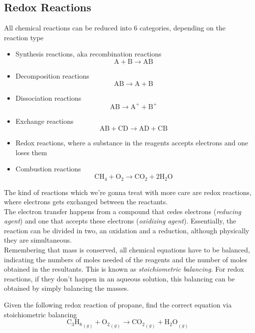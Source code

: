 \documentclass[../qm.tex]{subfiles}
\begin{document}
\subsection{Redox Reactions}
All chemical reactions can be reduced into 6 categories, depending on the reaction type
\begin{itemize}
\item Synthesis reactions, aka recombination reactions
	\begin{equation*}
		\mathrm{A}+\mathrm{B}\to\mathrm{AB}
	\end{equation*}
\item Decomposition reactions
	\begin{equation*}
		\mathrm{AB}\to\mathrm{A}+\mathrm{B}
	\end{equation*}
\item Dissociation reactions
	\begin{equation*}
		\mathrm{AB}\to\mathrm{A^+}+\mathrm{B^+}
	\end{equation*}
\item Exchange reactions
	\begin{equation*}
		\mathrm{AB}+\mathrm{CD}\to\mathrm{AD}+\mathrm{CB}
	\end{equation*}
\item Redox reactions, where a substance in the reagents accepts electrons and one loses them
\item Combustion reactions
	\begin{equation*}
		\mathrm{CH_4}+\mathrm{O_2}\to\mathrm{CO_2}+2\mathrm{H_2O}
	\end{equation*}
\end{itemize}
The kind of reactions which we're gonna treat with more care are redox reactions, where electrons gets exchanged between the reactants.\\
The electron transfer happens from a compound that cedes electrons (\textit{reducing agent}) and one that accepts these electrons  (\textit{oxidizing agent}). Essentially, the reaction can be divided in two, an oxidation and a reduction, although physically they are simultaneous.\\
Remembering that mass is conserved, all chemical equations have to be balanced, indicating the numbers of moles needed of the reagents and the number of moles obtained in the resultants. This is known as \textit{stoichiometric balancing}. For redox reactions, if they don't happen in an aqueous solution, this balancing can be obtained by simply balancing the masses.
\begin{exe}
	Given the following redox reaction of propane, find the correct equation via stoichiometric balancing
	\begin{equation}
		\mathrm{C_3H_8}_{(g)}+\mathrm{O_2}_{(g)}\to\mathrm{CO_2}_{(g)}+\mathrm{H_2O}_{(g)}
	\end{equation}
\end{exe}
\end{document}
